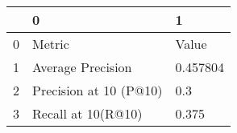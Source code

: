 \begin{tabular}{lll}
\toprule
{} &                       0 &         1 \\
\midrule
0 &                  Metric &     Value \\
1 &       Average Precision &  0.457804 \\
2 &  Precision at 10 (P@10) &       0.3 \\
3 &      Recall at 10(R@10) &     0.375 \\
\bottomrule
\end{tabular}
